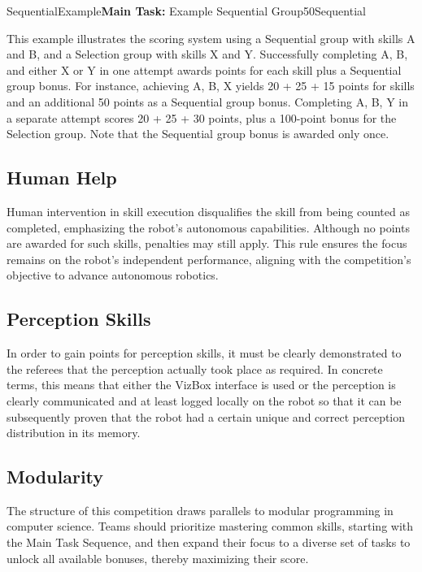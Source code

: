 \begin{Group}{SequentialExample}{\textbf{\textcolor{myturquoise}{Main Task:}} Example Sequential Group}{50}{Sequential}
\end{Group}
\setcounter{groupcounter}{0}

This example illustrates the scoring system using a Sequential group with skills A and B, and a Selection group with skills X and Y. Successfully completing A, B, and either X or Y in one attempt awards points for each skill plus a Sequential group bonus. For instance, achieving A, B, X yields 20 + 25 + 15 points for skills and an additional 50 points as a Sequential group bonus. Completing A, B, Y in a separate attempt scores 20 + 25 + 30 points, plus a 100-point bonus for the Selection group. Note that the Sequential group bonus is awarded only once.

\subsection*{Human Help}

Human intervention in skill execution disqualifies the skill from being counted as completed, emphasizing the robot's autonomous capabilities. Although no points are awarded for such skills, penalties may still apply. This rule ensures the focus remains on the robot's independent performance, aligning with the competition's objective to advance autonomous robotics.

\subsection*{Perception Skills}

In order to gain points for perception skills, it must be clearly demonstrated to the referees that the perception actually took place as required. In concrete terms, this means that either the VizBox interface is used or the perception is clearly communicated and at least logged locally on the robot so that it can be subsequently proven that the robot had a certain unique and correct perception distribution in its memory.


\subsection*{Modularity}

The structure of this competition draws parallels to modular programming in computer science. Teams should prioritize mastering common skills, starting with the Main Task Sequence, and then expand their focus to a diverse set of tasks to unlock all available bonuses, thereby maximizing their score.
